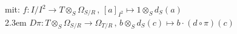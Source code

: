 \documentclass[10pt,a4paper]{report}
\newcommand{\function}[5]{#1:#2 \longrightarrow #3 \, , \, #4 \longmapsto #5}
\newcommand{\divR}[2]{\Omega_{#1/#2}}
\newcommand{\tensor}[3]{#1 \otimes_#2 #3}
\begin{document}
\begin{spacing}{1.5}
mit: $\function{f}{I/I^2}{{\tensor{T}{S}{\divR{S}{R}}}}{[a]_{I^2}}{\tensor{1}{S}{d_S(a)}}$\\
\leftskip2.3em $\function{D\pi}{\tensor{T}{S}{\divR{S}{R}}}{\divR{T}{R}}{\tensor{b}{S}{d_S(c)}}{b \cdot (d \circ \pi)(c)}$
\end{spacing}
\end{document}
